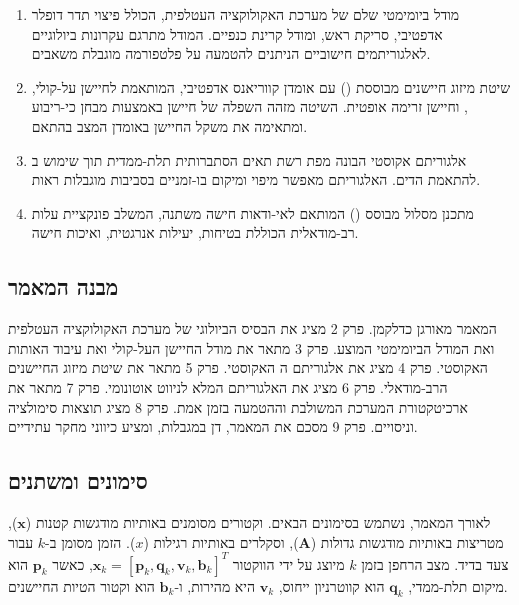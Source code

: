 \begin{enumerate}
    \item מודל ביומימטי שלם של מערכת האקולוקציה העטלפית, הכולל פיצוי תדר דופלר אדפטיבי, סריקת ראש, ומודל קרינת כנפיים. המודל מתרגם עקרונות ביולוגיים לאלגוריתמים חישוביים הניתנים להטמעה על פלטפורמה מוגבלת משאבים.
    \item שיטת מיזוג חיישנים מבוססת  () עם אומדן קווריאנס אדפטיבי, המותאמת לחיישן על-קולי, , וחיישן זרימה אופטית. השיטה מזהה השפלה של חיישן באמצעות מבחן כי-ריבוע ומתאימה את משקל החיישן באומדן המצב בהתאם.
    \item אלגוריתם  אקוסטי הבונה מפת רשת תאים הסתברותית תלת-ממדית תוך שימוש ב להתאמת הדים. האלגוריתם מאפשר מיפוי ומיקום בו-זמניים בסביבות מוגבלות ראות.
    \item מתכנן מסלול מבוסס  () המותאם לאי-ודאות חישה משתנה, המשלב פונקציית עלות רב-מודאלית הכוללת בטיחות, יעילות אנרגטית, ואיכות חישה. \cite{Thrun2005ProbRobotics} \cite{CrewAIDocs}
\end{enumerate}

\subsection{מבנה המאמר}
\label{sec:ch01_structure}

המאמר מאורגן כדלקמן. פרק 2 מציג את הבסיס הביולוגי של מערכת האקולוקציה העטלפית ואת המודל הביומימטי המוצע. פרק 3 מתאר את מודל החיישן העל-קולי ואת עיבוד האותות האקוסטי. פרק 4 מציג את אלגוריתם ה האקוסטי. פרק 5 מתאר את שיטת מיזוג החיישנים הרב-מודאלי. פרק 6 מציג את האלגוריתם המלא לניווט אוטונומי. פרק 7 מתאר את ארכיטקטורת המערכת המשולבת וההטמעה בזמן אמת. פרק 8 מציג תוצאות סימולציה וניסויים. פרק 9 מסכם את המאמר, דן במגבלות, ומציע כיווני מחקר עתידיים.

\subsection{סימונים ומשתנים}
\label{sec:ch01_notation}

לאורך המאמר, נשתמש בסימונים הבאים. וקטורים מסומנים באותיות מודגשות קטנות ($\mathbf{x}$), מטריצות באותיות מודגשות גדולות ($\mathbf{A}$), וסקלרים באותיות רגילות ($x$). הזמן מסומן ב-$k$ עבור צעד בדיד. מצב הרחפן בזמן $k$ מיוצג על ידי הווקטור $\mathbf{x}_k = [\mathbf{p}_k, \mathbf{q}_k, \mathbf{v}_k, \mathbf{b}_k]^T$, כאשר $\mathbf{p}_k$ הוא מיקום תלת-ממדי, $\mathbf{q}_k$ הוא קווטרניון ייחוס, $\mathbf{v}_k$ היא מהירות, ו-$\mathbf{b}_k$ הוא וקטור הטיות החיישנים. \cite{Thrun2005ProbRobotics}

